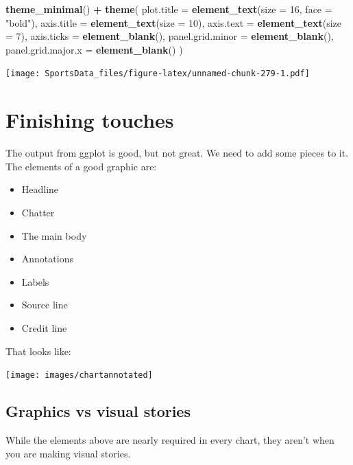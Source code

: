 \documentclass[
]{book}
\newenvironment{Shaded}{\begin{snugshade}}{\end{snugshade}}
\newcommand{\DataTypeTok}[1]{\textcolor[rgb]{0.13,0.29,0.53}{#1}}
\newcommand{\DecValTok}[1]{\textcolor[rgb]{0.00,0.00,0.81}{#1}}
\newcommand{\KeywordTok}[1]{\textcolor[rgb]{0.13,0.29,0.53}{\textbf{#1}}}
\newcommand{\NormalTok}[1]{#1}
\newcommand{\OperatorTok}[1]{\textcolor[rgb]{0.81,0.36,0.00}{\textbf{#1}}}
\newcommand{\StringTok}[1]{\textcolor[rgb]{0.31,0.60,0.02}{#1}}
\providecommand{\tightlist}{%
  \setlength{\itemsep}{0pt}\setlength{\parskip}{0pt}}
\begin{document}
\begin{Shaded}
\begin{Highlighting}[]
\StringTok{  }\KeywordTok{theme_minimal}\NormalTok{() }\OperatorTok{+}\StringTok{ }
\StringTok{  }\KeywordTok{theme}\NormalTok{(}
    \DataTypeTok{plot.title =} \KeywordTok{element_text}\NormalTok{(}\DataTypeTok{size =} \DecValTok{16}\NormalTok{, }\DataTypeTok{face =} \StringTok{"bold"}\NormalTok{),}
    \DataTypeTok{axis.title =} \KeywordTok{element_text}\NormalTok{(}\DataTypeTok{size =} \DecValTok{10}\NormalTok{),}
    \DataTypeTok{axis.text =} \KeywordTok{element_text}\NormalTok{(}\DataTypeTok{size =} \DecValTok{7}\NormalTok{),}
    \DataTypeTok{axis.ticks =} \KeywordTok{element_blank}\NormalTok{(),}
    \DataTypeTok{panel.grid.minor =} \KeywordTok{element_blank}\NormalTok{(),}
    \DataTypeTok{panel.grid.major.x =} \KeywordTok{element_blank}\NormalTok{()}
\NormalTok{  )}
\end{Highlighting}
\end{Shaded}

\texttt{[image: SportsData\_files/figure-latex/unnamed-chunk-279-1.pdf]}

\hypertarget{finishing-touches}{%
\chapter{Finishing touches}\label{finishing-touches}}

The output from ggplot is good, but not great. We need to add some pieces to it. The elements of a good graphic are:

\begin{itemize}
\tightlist
\item
  Headline
\item
  Chatter
\item
  The main body
\item
  Annotations
\item
  Labels
\item
  Source line
\item
  Credit line
\end{itemize}

That looks like:

\texttt{[image: images/chartannotated]}

\hypertarget{graphics-vs-visual-stories}{%
\section{Graphics vs visual stories}\label{graphics-vs-visual-stories}}

While the elements above are nearly required in every chart, they aren't when you are making visual stories.
\end{document}
